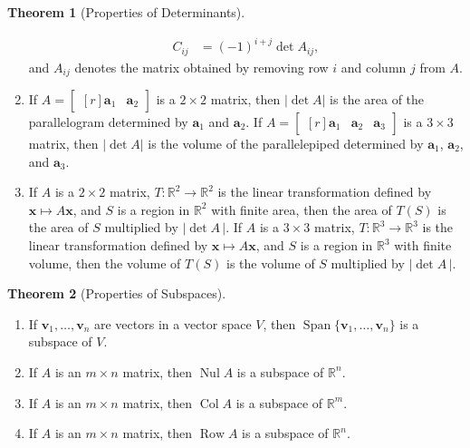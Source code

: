 \documentclass{myart}
\renewcommand{\vec}[1]{\ensuremath{\mathbf{#1}}} %
\newcommand{\mat}[1]{\ensuremath{#1}} %
\newcommand{\R}[1][]{\ensuremath{\mathbb{R}^{#1}}} %
\newcommand{\by}{\ensuremath{\times}} %
\newcommand{\MAT}[2][r]{\ensuremath{\begin{bmatrix*}[#1]#2\end{bmatrix*}}} %
\DeclareMathOperator{\OpSpan}{Span} %
\newcommand{\Span}[1]{\ensuremath{\OpSpan\{#1\}}} %
\DeclareMathOperator{\Nul}{Nul} %
\DeclareMathOperator{\Col}{Col} %
\DeclareMathOperator{\Row}{Row} %
\newcommand{\many}[2][n]{\ensuremath{{#2}_1, \ldots, {#2}_{#1}}} %
\theoremstyle{definition}
\newtheorem{thm}{Theorem}
\begin{document}
\begin{thm}[Properties of Determinants]
\begin{enumerate}
\begin{align*}
C_{ij} &= (-1)^{i+j}\det \mat A_{ij},
\end{align*}
and $\mat A_{ij}$ denotes the matrix obtained by removing row $i$ and column $j$ from \mat A.
\item If $\mat A = \MAT{\vec a_1 & \vec a_2}$ is a $2 \by 2$ matrix, then $|\det \mat A|$ is the area of the parallelogram determined by $\vec a_1$ and $\vec a_2$. If $\mat A = \MAT{\vec a_1 & \vec a_2 & \vec a_3}$ is a $3 \by 3$ matrix, then $|\det \mat A|$ is the volume of the parallelepiped determined by $\vec a_1$, $\vec a_2$, and $\vec a_3$.
\item If \mat A is a $2 \by 2$ matrix, $T : \R[2] \to \R[2]$ is the linear transformation defined by $\vec x \mapsto \mat A\vec x$, and $S$ is a region in \R[2] with finite area, then the area of $T(S)$ is the area of $S$ multiplied by $|\det \mat A\,|$. If \mat A is a $3 \by 3$ matrix, $T : \R[3] \to \R[3]$ is the linear transformation defined by $\vec x \mapsto \mat A\vec x$, and $S$ is a region in \R[3] with finite volume, then the volume of $T(S)$ is the volume of $S$ multiplied by $|\det \mat A\,|$.
\end{enumerate}
\end{thm}

\begin{thm}[Properties of Subspaces] \hfill
\begin{enumerate}
\item If \many{\vec v} are vectors in a vector space $V$, then \Span{\many{\vec v}} is a subspace of $V$.
\item If \mat A is an $m \by n$ matrix, then $\Nul \mat A$ is a subspace of \R[n].
\item If \mat A is an $m \by n$ matrix, then $\Col \mat A$ is a subspace of \R[m].
\item If \mat A is an $m \by n$ matrix, then $\Row \mat A$ is a subspace of \R[n].
\end{enumerate}
\end{thm}
\end{document}
